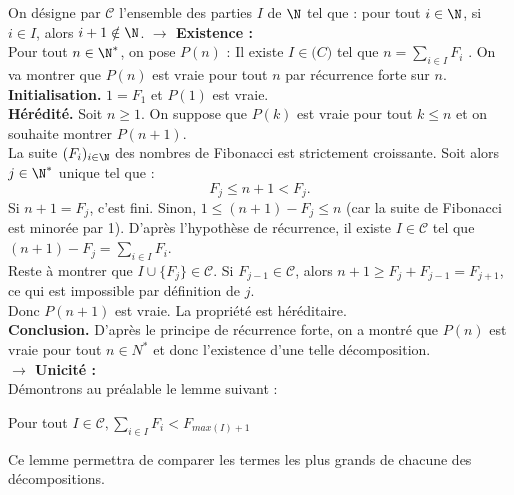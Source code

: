 \begin{Soln}{50}
On désigne par $\mathcal C$ l'ensemble des parties $I$ de $\N$ tel que : pour tout $i \in \N$, si $i \in I$, alors $i+1 \notin \N$.
\textbf{$\rightarrow$ Existence : }\\
Pour tout $n \in \N^*$, on pose $P(n)$ : \og Il existe $I \in \mathcal(C)$ tel que $n = \sum_{i \in I} F_i$ \fg. On va montrer que $P(n)$ est vraie pour tout $n$  par récurrence forte sur $n$.\\
\textbf{Initialisation.} $1 = F_1$ et $P(1)$ est vraie.\\
\textbf{Hérédité.} Soit $n \geq 1$. On suppose que $P(k)$ est vraie pour tout $k \leq n$ et on souhaite montrer $P(n+1)$.\\
La suite $(F_i)_{i \in \N}$ des nombres de Fibonacci est strictement croissante. Soit alors $j \in \N^*$ unique tel que :
$$ F_j \leq n+1 < F_j.$$
Si $n+1 = F_j$, c'est fini. Sinon, $1 \leq (n+1) - F_j \leq n$ (car la suite de Fibonacci est minorée par 1). D'après l'hypothèse de récurrence, il existe $I \in \mathcal{C}$ tel que $(n+1) - F_j = \sum_{i \in I} F_i$.\\
Reste à montrer que $I \cup \{F_j\} \in \mathcal{C}$. Si $F_{j-1} \in \mathcal{C}$, alors $n+1 \geq F_j + F_{j-1} = F_{j+1}$, ce qui est impossible par définition de $j$.\\
Donc $P(n+1)$ est vraie. La propriété est héréditaire.\\
\textbf{Conclusion.} D'après le principe de récurrence forte, on a montré que $P(n)$ est vraie pour tout $n \in N^*$ et donc l'existence d'une telle décomposition.\\


\textbf{$\rightarrow$ Unicité : }\\
Démontrons au préalable le lemme suivant :
\begin{center}
Pour tout $I \in \mathcal{C}, \sum_{i \in I} F_i < F_{max(I) + 1}$
\end{center}

Ce lemme permettra de comparer les termes les plus grands de chacune des décompositions.


\end{Soln}
